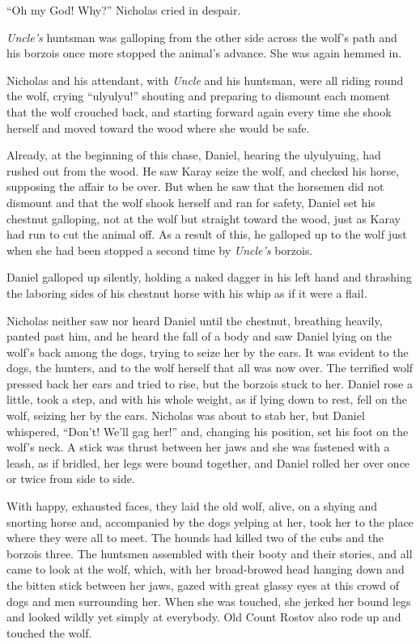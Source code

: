 ``Oh my God! Why?'' Nicholas cried in despair.

\emph{Uncle's} huntsman was galloping from the other side across
the wolf's path and his borzois once more stopped the animal's
advance. She was again hemmed in.

Nicholas and his attendant, with \emph{Uncle} and his huntsman,
were all riding round the wolf, crying ``ulyulyu!'' shouting and
preparing to dismount each moment that the wolf crouched back,
and starting forward again every time she shook herself and moved
toward the wood where she would be safe.

Already, at the beginning of this chase, Daniel, hearing the
ulyulyuing, had rushed out from the wood. He saw Karay seize the
wolf, and checked his horse, supposing the affair to be over. But
when he saw that the horsemen did not dismount and that the wolf
shook herself and ran for safety, Daniel set his chestnut
galloping, not at the wolf but straight toward the wood, just as
Karay had run to cut the animal off. As a result of this, he
galloped up to the wolf just when she had been stopped a second
time by \emph{Uncle's} borzois.

Daniel galloped up silently, holding a naked dagger in his left
hand and thrashing the laboring sides of his chestnut horse with
his whip as if it were a flail.

Nicholas neither saw nor heard Daniel until the chestnut,
breathing heavily, panted past him, and he heard the fall of a
body and saw Daniel lying on the wolf's back among the dogs,
trying to seize her by the ears. It was evident to the dogs, the
hunters, and to the wolf herself that all was now over. The
terrified wolf pressed back her ears and tried to rise, but the
borzois stuck to her. Daniel rose a little, took a step, and with
his whole weight, as if lying down to rest, fell on the wolf,
seizing her by the ears. Nicholas was about to stab her, but
Daniel whispered, ``Don't! We'll gag her!'' and, changing his
position, set his foot on the wolf's neck. A stick was thrust
between her jaws and she was fastened with a leash, as if
bridled, her legs were bound together, and Daniel rolled her over
once or twice from side to side.

With happy, exhausted faces, they laid the old wolf, alive, on a
shying and snorting horse and, accompanied by the dogs yelping at
her, took her to the place where they were all to meet. The
hounds had killed two of the cubs and the borzois three. The
huntsmen assembled with their booty and their stories, and all
came to look at the wolf, which, with her broad-browed head
hanging down and the bitten stick between her jaws, gazed with
great glassy eyes at this crowd of dogs and men surrounding
her. When she was touched, she jerked her bound legs and looked
wildly yet simply at everybody. Old Count Rostov also rode up and
touched the wolf.

